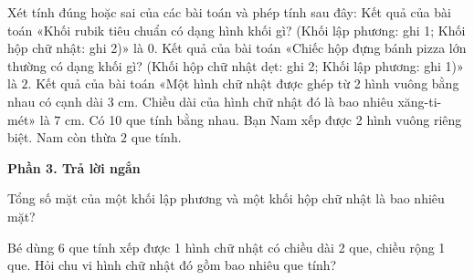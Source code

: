 \begin{ex} %
Xét tính đúng hoặc sai của các bài toán và phép tính sau đây:
\choiceTF
{Kết quả của bài toán «Khối rubik tiêu chuẩn có dạng hình khối gì? (Khối lập phương: ghi 1; Khối hộp chữ nhật: ghi 2)» là $0$.}
{\True Kết quả của bài toán «Chiếc hộp đựng bánh pizza lớn thường có dạng khối gì? (Khối hộp chữ nhật dẹt: ghi 2; Khối lập phương: ghi 1)» là $2$.}
{Kết quả của bài toán «Một hình chữ nhật được ghép từ 2 hình vuông bằng nhau có cạnh dài 3 cm. Chiều dài của hình chữ nhật đó là bao nhiêu xăng-ti-mét» là $7\text{ cm}$.}
{\True Có 10 que tính bằng nhau. Bạn Nam xếp được 2 hình vuông riêng biệt. Nam còn thừa $2$ que tính.}
\end{ex}

\textbf{Phần 3. Trả lời ngắn}

\begin{ex} %
Tổng số mặt của một khối lập phương và một khối hộp chữ nhật là bao nhiêu mặt?
\end{ex}

\begin{ex} %
Bé dùng 6 que tính xếp được 1 hình chữ nhật có chiều dài 2 que, chiều rộng 1 que. Hỏi chu vi hình chữ nhật đó gồm bao nhiêu que tính?
\end{ex}

